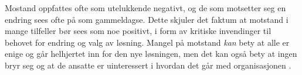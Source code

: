 \noindent
Mostand oppfattes ofte som utelukkende negativt, og de som motsetter seg en endring sees ofte på som gammeldagse. Dette skjuler det faktum at motstand i mange tilfeller bør sees som noe positivt, i form av kritiske invendinger til behovet for endring og valg av løsning. Mangel på motstand \emph{kan} bety at alle er enige og går helhjertet inn for den nye løsningen, men det kan også bety at ingen bryr seg og at de ansatte er uinteressert i hvordan det går med organisasjonen \citep{Jacobsen12}.